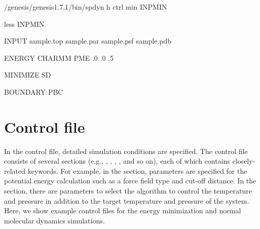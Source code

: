 \documentclass[a4paper,11pt,oneside,english]{sphinxmanual}
\begin{document}
\begin{sphinxVerbatim}[commandchars=\\\{\}]
\PYGZdl{} \PYGZti{}/genesis/genesis\PYGZhy{}1.7.1/bin/spdyn \PYGZhy{}h ctrl min \PYGZgt{} INPMIN

\PYGZdl{} less INPMIN

\PYG{o}{[}INPUT\PYG{o}{]}
  sample.top      
  sample.par      
  sample.psf      
  sample.pdb      

\PYG{o}{[}ENERGY\PYG{o}{]}
     CHARMM    
  PME       
     .0      
     .0      
   .5      

\PYG{o}{[}MINIMIZE\PYG{o}{]}
         SD        
                

\PYG{o}{[}BOUNDARY\PYG{o}{]}
           PBC       
\end{sphinxVerbatim}

\clearpage


\section{Control file}
\label{\detokenize{01_Getting_Started:control-file}}
In the control file, detailed simulation conditions are specified.
The control file consists of several sections (e.g., \sphinxstylestrong{{[}INPUT{]}},
\sphinxstylestrong{{[}OUTPUT{]}}, \sphinxstylestrong{{[}ENERGY{]}}, \sphinxstylestrong{{[}ENSEMBLE{]}}, and so on),
each of which contains closely-related keywords.
For example, in the \sphinxstylestrong{{[}ENERGY{]}} section, parameters are specified for the potential energy calculation
such as a force field type and cut-off distance.
In the \sphinxstylestrong{{[}ENSEMBLE{]}} section, there are parameters to select the algorithm to control the temperature
and pressure in addition to the target temperature and pressure of the system.
Here, we show example control files for the energy minimization and normal molecular dynamics simulations.
\end{document}
